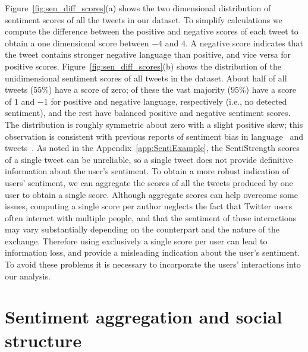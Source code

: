 \documentclass{article}
\begin{document}
Figure~\ref{fig:sen_diff_scores}(a) shows the two dimensional
distribution of sentiment scores of all the tweets in our dataset. To
simplify calculations we compute the difference between the positive
and negative scores of each tweet to obtain a one dimensional score
between $-4$ and $4$. A negative score indicates that the tweet
contains stronger negative language than positive, and vice versa for
positive scores. Figure~\ref{fig:sen_diff_scores}(b) shows the
distribution of the unidimensional sentiment scores of all tweets in
the dataset.  About half of all tweets ($55\%$) have a score of zero;
of these the vast majority ($95\%$) have a score of $1$ and $-1$ for
positive and negative language, respectively (i.e., no detected
sentiment), and the rest have balanced positive and negative sentiment
scores. The distribution is roughly symmetric about zero with a slight
positive skew; this observation is consistent with previous reports of
sentiment bias in language~\cite{Dodds2015} and
tweets~\cite{Charlton2016InTheMood}. As noted in the
Appendix~\ref{app:SentiExample}, the SentiStrength scores of a single
tweet can be unreliable, so a single tweet does not provide definitive
information about the user's sentiment. To obtain a more robust
indication of users' sentiment, we can aggregate the scores of all the
tweets produced by one user to obtain a single score. Although
aggregate scores can help overcome some issues, computing a single
score per author neglects the fact that Twitter users often interact
with multiple people, and that the sentiment of these interactions may
vary substantially depending on the counterpart and the nature of the
exchange. Therefore using exclusively a single score per user can lead
to information loss, and provide a misleading indication about the
user's sentiment. To avoid these problems it is necessary to
incorporate the users' interactions into our analysis.


\section{Sentiment aggregation and social structure}
\label{sec:networkConstruction}
\end{document}
